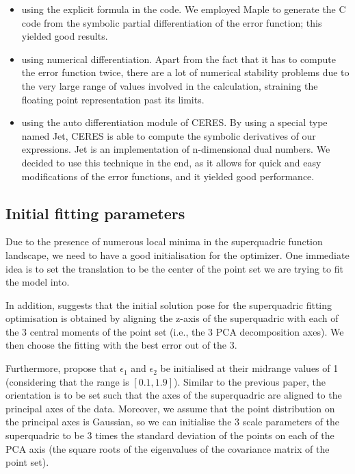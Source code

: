 \documentclass{article}
\begin{document}
\begin{itemize}
	\item {using the explicit formula in the code. We employed Maple to generate the C code from the symbolic partial differentiation of the error function; this yielded good results.}
	\item {using numerical differentiation. Apart from the fact that it has to compute the error function twice, there are a lot of numerical stability problems due to the very large range of values involved in the calculation, straining the floating point representation past its limits.}
	\item {using the auto differentiation module of CERES. By using a special type named Jet, CERES is able to compute the symbolic derivatives of our expressions. Jet is an implementation of n-dimensional dual numbers. We decided to use this technique in the end, as it allows for quick and easy modifications of the error functions, and it yielded good performance.}
\end{itemize}

\subsection*{Initial fitting parameters}

Due to the presence of numerous local minima in the superquadric function landscape, we need to have a good initialisation for the optimizer. One immediate idea is to set the translation to be the center of the point set we are trying to fit the model into.

In addition, \cite{conf/icra/BiegelbauerV07} suggests that the initial solution pose for the superquadric fitting optimisation is obtained by aligning the z-axis of the superquadric with each of the 3 central moments of the point set (i.e., the 3 PCA decomposition axes). We then choose the fitting with the best error out of the 3.

Furthermore, \cite{xiao2005building} propose that $\epsilon_1$ and $\epsilon_2$ be initialised at their midrange values of 1 (considering that the range is $[0.1, 1.9]$). Similar to the previous paper, the orientation is to be set such that the axes of the superquadric are aligned to the principal axes of the data. Moreover, we assume that the point distribution on the principal axes is Gaussian, so we can initialise the 3 scale parameters of the superquadric to be 3 times the standard deviation of the points on each of the PCA axis (the square roots of the eigenvalues of the covariance matrix of the point set).
\end{document}
